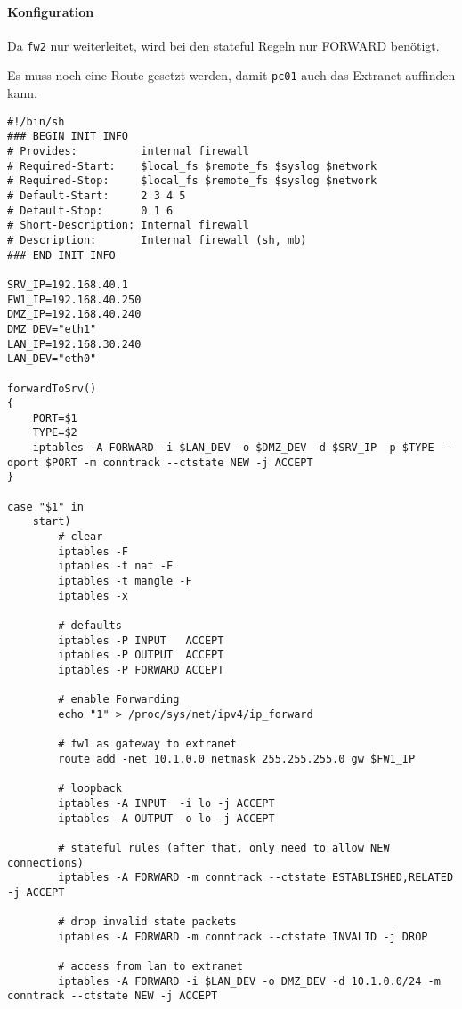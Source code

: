 \paragraph{Konfiguration}

Da {\tt fw2} nur weiterleitet, wird bei den stateful
Regeln nur FORWARD benötigt.

Es muss noch eine Route gesetzt werden, damit {\tt pc01} auch das Extranet
auffinden kann.

\begin{lstlisting}[label=lst:masq,caption={Basisskript interne Firewall.}]
#!/bin/sh
### BEGIN INIT INFO
# Provides:          internal firewall
# Required-Start:    $local_fs $remote_fs $syslog $network
# Required-Stop:     $local_fs $remote_fs $syslog $network
# Default-Start:     2 3 4 5
# Default-Stop:      0 1 6
# Short-Description: Internal firewall
# Description:       Internal firewall (sh, mb)
### END INIT INFO

SRV_IP=192.168.40.1
FW1_IP=192.168.40.250
DMZ_IP=192.168.40.240
DMZ_DEV="eth1"
LAN_IP=192.168.30.240
LAN_DEV="eth0"

forwardToSrv()
{
    PORT=$1
    TYPE=$2
    iptables -A FORWARD -i $LAN_DEV -o $DMZ_DEV -d $SRV_IP -p $TYPE --dport $PORT -m conntrack --ctstate NEW -j ACCEPT
}

case "$1" in
    start)
        # clear
        iptables -F
        iptables -t nat -F
        iptables -t mangle -F
        iptables -x

        # defaults
        iptables -P INPUT   ACCEPT
        iptables -P OUTPUT  ACCEPT
        iptables -P FORWARD ACCEPT

        # enable Forwarding
        echo "1" > /proc/sys/net/ipv4/ip_forward

        # fw1 as gateway to extranet
        route add -net 10.1.0.0 netmask 255.255.255.0 gw $FW1_IP

        # loopback
        iptables -A INPUT  -i lo -j ACCEPT
        iptables -A OUTPUT -o lo -j ACCEPT

        # stateful rules (after that, only need to allow NEW connections)
        iptables -A FORWARD -m conntrack --ctstate ESTABLISHED,RELATED -j ACCEPT

        # drop invalid state packets
        iptables -A FORWARD -m conntrack --ctstate INVALID -j DROP

        # access from lan to extranet
        iptables -A FORWARD -i $LAN_DEV -o DMZ_DEV -d 10.1.0.0/24 -m conntrack --ctstate NEW -j ACCEPT


\end{lstlisting}
